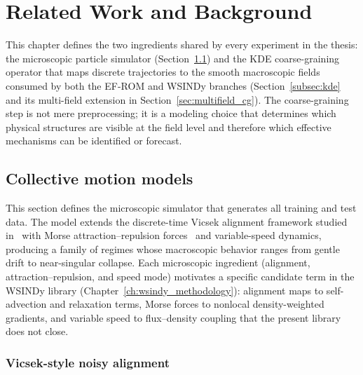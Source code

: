\chapter{Related Work and Background}
\label{ch:background}

This chapter defines the two ingredients shared by every experiment in the thesis: the microscopic particle simulator (Section~\ref{sec:collective_motion}) and the KDE coarse-graining operator that maps discrete trajectories to the smooth macroscopic fields consumed by both the EF-ROM and WSINDy branches (Section~\ref{subsec:kde} and its multi-field extension in Section~\ref{sec:multifield_cg}).  The coarse-graining step is not mere preprocessing; it is a modeling choice that determines which physical structures are visible at the field level and therefore which effective mechanisms can be identified or forecast.

\section{Collective motion models}
\label{sec:collective_motion}

This section defines the microscopic simulator that generates all training
and test data.  The model extends the discrete-time
Vicsek alignment framework studied in~\cite{alvarez2025eqfree} with Morse
attraction--repulsion forces~\cite{dorsogna2006morse} and variable-speed dynamics, producing a family
of regimes whose macroscopic behavior ranges from gentle drift to
near-singular collapse.  Each microscopic ingredient (alignment,
attraction--repulsion, and speed mode) motivates a specific candidate term in the WSINDy library (Chapter~\ref{ch:wsindy_methodology}): alignment maps to self-advection and relaxation terms, Morse forces to nonlocal density-weighted gradients, and variable speed to flux--density coupling that the present library does not close.

\subsection{Vicsek-style noisy alignment}


